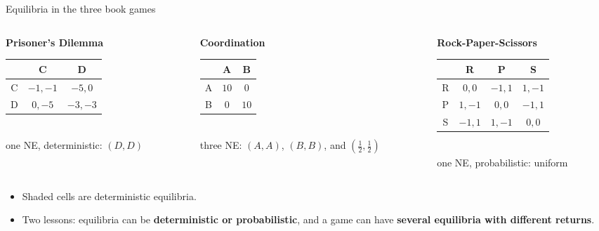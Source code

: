 \documentclass[aspectratio=169,11pt]{beamer}
\begin{document}
\begin{frame}{Equilibria in the three book games}
  \begin{columns}[T]
    \begin{column}{0.32\textwidth}
      \centering \textbf{Prisoner's Dilemma}\\[3pt]
      \footnotesize
      \begin{tabular}{c|cc}
          & C & D \\ \hline
        C & $-1,-1$ & $-5,0$ \\
        D & $0,-5$ & \cellcolor{cred!20}$-3,-3$
      \end{tabular}\\[5pt]
      \small one NE, deterministic: $(D,D)$
    \end{column}
    \begin{column}{0.32\textwidth}
      \centering \textbf{Coordination}\\[3pt]
      \footnotesize
      \begin{tabular}{c|cc}
          & A & B \\ \hline
        A & \cellcolor{cgreen!20}$10$ & $0$ \\
        B & $0$ & \cellcolor{cgreen!20}$10$
      \end{tabular}\\[5pt]
      \small three NE: $(A,A)$, $(B,B)$, and $(\tfrac12, \tfrac12)$
    \end{column}
    \begin{column}{0.32\textwidth}
      \centering \textbf{Rock-Paper-Scissors}\\[3pt]
      \footnotesize
      \begin{tabular}{c|ccc}
          & R & P & S \\ \hline
        R & $0,0$ & $-1,1$ & $1,-1$ \\
        P & $1,-1$ & $0,0$ & $-1,1$ \\
        S & $-1,1$ & $1,-1$ & $0,0$
      \end{tabular}\\[5pt]
      \small one NE, probabilistic: uniform
    \end{column}
  \end{columns}
  \bigskip
  \begin{itemize}
    \item Shaded cells are deterministic equilibria.
    \item Two lessons: equilibria can be \textbf{deterministic or probabilistic}, and a game can have \textbf{several equilibria with different returns}.
  \end{itemize}
\end{frame}
\end{document}
